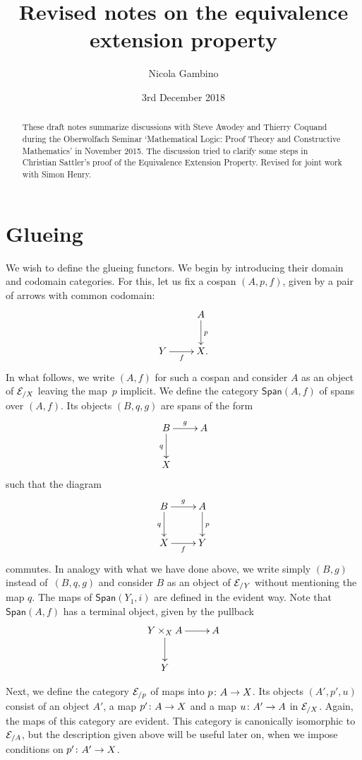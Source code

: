 \documentclass[reqno,a4paper,oneside]{amsart}
\title[]{Revised notes on the equivalence extension property}
\author{Nicola Gambino}
\date{3rd December 2018}
\begin{document}
\begin{abstract} These draft notes summarize discussions with Steve Awodey and Thierry Coquand during the Oberwolfach Seminar `Mathematical Logic: Proof Theory and Constructive Mathematics'
in November 2015. The discussion tried to clarify some steps in Christian Sattler's proof of the Equivalence Extension Property. Revised for joint work with Simon Henry.
\end{abstract} 


\maketitle


\section{Glueing} 

We wish to define the glueing functors. We begin by introducing their domain and codomain categories. 
For this, let us fix a cospan $(A, p, f)$, given by a pair of arrows with common codomain:
\[
\xymatrix{
 & A \ar[d]^{p} \\
Y \ar[r]_f & X \rlap{.}}
\]
In what follows, we write $(A, f)$ for such a cospan and consider $A$ as an object of $\cal{E}_{/X}$ leaving the map~$p$ implicit.  
We define the category $\mathsf{Span}(A, f)$ of spans over $(A, f)$. Its objects $(B, q, g)$ are spans of the form
\[
\xymatrix{
B \ar[r]^g \ar[d]_{q}   & A \\
X & }
\]
such that the diagram 
\begin{equation}
\label{equ:sq-span}
\begin{gathered}
\xymatrix{
B \ar[d]_{q} \ar[r]^{g}  & A \ar[d]^{p} \\
X \ar[r]_f & Y }
\end{gathered}
\end{equation}
commutes. In analogy with what we have done above, we write simply $(B,g)$ instead of~$(B,q,g)$ and consider $B$ as an object of $\cal{E}_{/Y}$ without mentioning the map $q$.  
The maps of $\mathsf{Span}(Y_1, i)$ are defined in the evident way. Note that  $\mathsf{Span}(A, f)$ has a terminal object, given by the pullback
\[
\xymatrix{
Y \times_X A \ar[r] \ar[d] & A \\
Y & }
\]

Next, we define the category $\cal{E}_{/p}$ of maps into $p \co A \to X$. Its objects $(A', p', u)$ consist of an object $A'$, a map $p' \co A \to X$ and a map $u \co A' \to A$ in $\cal{E}_{/X}$. 
Again, the maps of this category are evident. This category is canonically isomorphic to $\cal{E}_{/A}$, but the description given above will be useful later on, when we impose conditions
on $p' \co A' \to X$.
\end{document}
